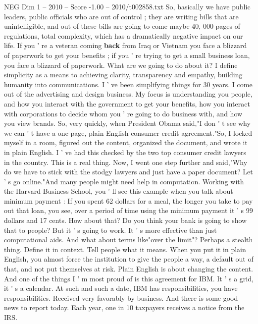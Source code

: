 \begin{textsample}{NEG Dim 1 – 2010 – Score -1.00 – 2010/t002858.txt}  \label{ex:f1_neg_053}
So, basically we have public leaders, public officials who are out of control ; they are writing bills that are unintelligible, and out of these bills are going to come maybe 40, 000 pages of regulations, total complexity, which has a dramatically negative impact on our life.
If you ' re a veteran coming \textbf{back} from Iraq or Vietnam you face a blizzard of paperwork to get your benefits ; if you ' re trying to get a small business loan, you face a blizzard of paperwork.
What are we going to do about it?
I define simplicity as a means to achieving clarity, transparency and empathy, building humanity into communications.
I ' ve been simplifying things for 30 years.
I come out of the advertising and design business.
My focus is understanding you people, and how you interact with the government to get your benefits, how you interact with corporations to decide whom you ' re going to do business with, and how you view brands.
So, very quickly, when President Obama said,"I don ' t see why we can ' t have a one-page, plain English consumer credit agreement."So, I locked myself in a room, figured out the content, organized the document, and wrote it in plain English.
I ' ve had this checked by the two top consumer credit lawyers in the country.
This is a real thing.
Now, I went one step further and said,"Why do we have to stick with the stodgy lawyers and just have a paper document?
Let ' s go online."And many people might need help in computation.
Working with the Harvard Business School, you ' ll see this example when you talk about minimum payment : If you spent 62 dollars for a meal, the longer you take to pay out that loan, you see, over a period of time using the minimum payment it ' s 99 dollars and 17 cents.
How about that?
Do you think your bank is going to show that to people?
But it ' s going to work.
It ' s more effective than just computational aids.
And what about terms like"over the limit"?
Perhaps a stealth thing.
Define it in context.
Tell people what it means.
When you put it in plain English, you almost force the institution to give the people a way, a default out of that, and not put themselves at risk.
Plain English is about changing the content.
And one of the things I ' m most proud of is this agreement for IBM.
It ' s a grid, it ' s a calendar.
At such and such a date, IBM has responsibilities, you have responsibilities.
Received very favorably by business.
And there is some good news to report today.
Each year, one in 10 taxpayers receives a notice from the IRS.

\end{textsample}
